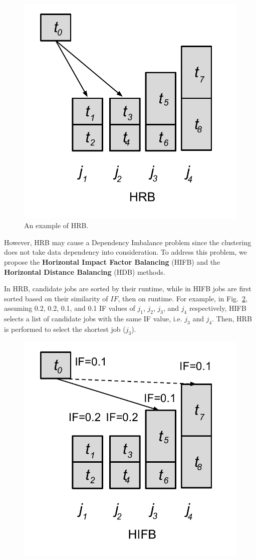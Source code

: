 \begin{figure}[htb]
	\centering
	\includegraphics[width=0.5\linewidth]{figure/algorithm_hrb.pdf}
	\caption{An example of HRB.}
	\label{fig:algorithm_hrb}
	\vspace{-15pt}
\end{figure}

However, HRB may cause a Dependency Imbalance problem since the clustering does not take data dependency into consideration. To address this problem, we propose the \textbf{Horizontal Impact Factor Balancing} (HIFB) and the \textbf{Horizontal Distance Balancing} (HDB) methods. 

In HRB, candidate jobs are sorted by their runtime, while in HIFB jobs are first sorted based on their similarity of $IF$, then on runtime. For example, in Fig.~\ref{fig:algorithm_hifb}, assuming 0.2, 0.2, 0.1, and 0.1 IF values of $j_1$, $j_2$, $j_3$, and $j_4$ respectively, HIFB selects a list of candidate jobs with the same IF value, i.e. $j_3$ and $j_4$. Then, HRB is performed to select the shortest job ($j_3$). 

\begin{figure}[htb]
	\centering
	\includegraphics[width=0.5\linewidth]{figure/algorithm_hifb.pdf}
	\label{fig:algorithm_hifb}
	\vspace{-15pt}
\end{figure}


